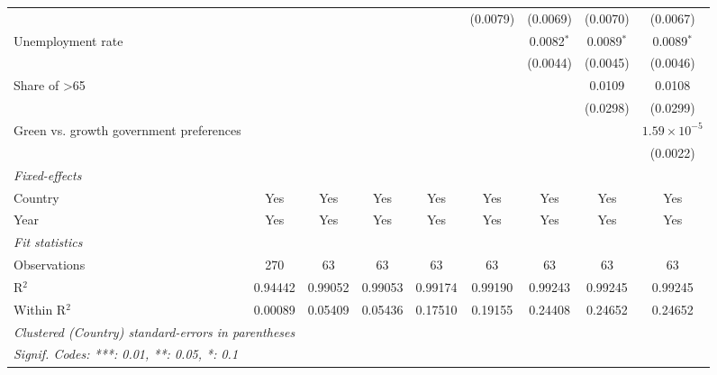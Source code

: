 \begin{table}[htbp]
\begin{tabular}{lcccccccc}
                                                                             &          &          &          &              & (0.0079)     & (0.0069)     & (0.0070)     & (0.0067)\\   
      Unemployment rate                                                      &          &          &          &              &              & 0.0082$^{*}$ & 0.0089$^{*}$ & 0.0089$^{*}$\\   
                                                                             &          &          &          &              &              & (0.0044)     & (0.0045)     & (0.0046)\\   
      Share of >65                                                           &          &          &          &              &              &              & 0.0109       & 0.0108\\   
                                                                             &          &          &          &              &              &              & (0.0298)     & (0.0299)\\   
      Green vs. growth government preferences                                &          &          &          &              &              &              &              & $1.59\times 10^{-5}$\\    
                                                                             &          &          &          &              &              &              &              & (0.0022)\\   
      \midrule
      \emph{Fixed-effects}\\
      Country                                                                & Yes      & Yes      & Yes      & Yes          & Yes          & Yes          & Yes          & Yes\\  
      Year                                                                   & Yes      & Yes      & Yes      & Yes          & Yes          & Yes          & Yes          & Yes\\  
      \midrule
      \emph{Fit statistics}\\
      Observations                                                           & 270      & 63       & 63       & 63           & 63           & 63           & 63           & 63\\  
      R$^2$                                                                  & 0.94442  & 0.99052  & 0.99053  & 0.99174      & 0.99190      & 0.99243      & 0.99245      & 0.99245\\  
      Within R$^2$                                                           & 0.00089  & 0.05409  & 0.05436  & 0.17510      & 0.19155      & 0.24408      & 0.24652      & 0.24652\\  
      \midrule \midrule
      \multicolumn{9}{l}{\emph{Clustered (Country) standard-errors in parentheses}}\\
      \multicolumn{9}{l}{\emph{Signif. Codes: ***: 0.01, **: 0.05, *: 0.1}}\\
   \end{tabular}
\end{table}


